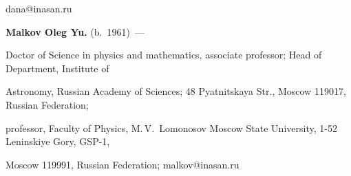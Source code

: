 dana@inasan.ru





\vspace*{3pt}





\noindent


\textbf{Malkov Oleg Yu.} (b.\ 1961)~---


Doctor of Science in physics and mathematics, associate professor; Head of Department, Institute of


Astronomy, Russian Academy of Sciences; 48 Pyatnitskaya Str., Moscow 119017, Russian Federation;


professor, Faculty of Physics, M.\,V.~Lomonosov Moscow State University, 1-52 Leninskiye Gory, GSP-1,


Moscow 119991, Russian Federation; malkov@inasan.ru






























\newpage





\vspace*{-18pt}








\def\tit{МЕТОДЫ И~СРЕДСТВА ПОДДЕРЖКИ ИССЛЕДОВАНИЙ, ДВИЖИМЫХ ГИПОТЕЗАМИ: ОБЗОР}





\def\aut{Л.\,А.~Калиниченко$^1$, Д.\,Ю.~Ковалев$^2$, Д.\,А.~Ковалева$^3$, О.\,Ю.~Малков$^4$}








